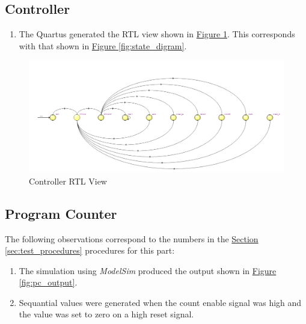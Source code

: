 
\subsection{Controller} %
\label{sub:controller}

\begin{enumerate}
    \item The Quartus generated the RTL view shown in \hyperref[fig:controller_rtl]{Figure \ref*{fig:controller_rtl}}.
    This corresponds with that shown in \hyperref[fig:state_digram]{Figure \ref*{fig:state_digram}}.
\end{enumerate}

\begin{figure}
    \includegraphics[width=\textwidth]{images/controller_rtl.png}
    \caption{Controller RTL View \label{fig:controller_rtl}}
\end{figure}


\subsection{Program Counter} %
\label{sub:program_counter}

The following observations correspond to the numbers in the \hyperref[sec:test_procedures]{Section \ref*{sec:test_procedures}} procedures for this part:

\begin{enumerate}
    \item The simulation using \emph{ModelSim} produced the output shown in \hyperref[fig:pc_output]{Figure \ref*{fig:pc_output}}.
    \item Sequantial values were generated when the count enable signal was high and the value was set to zero on a high reset signal.
\end{enumerate}

